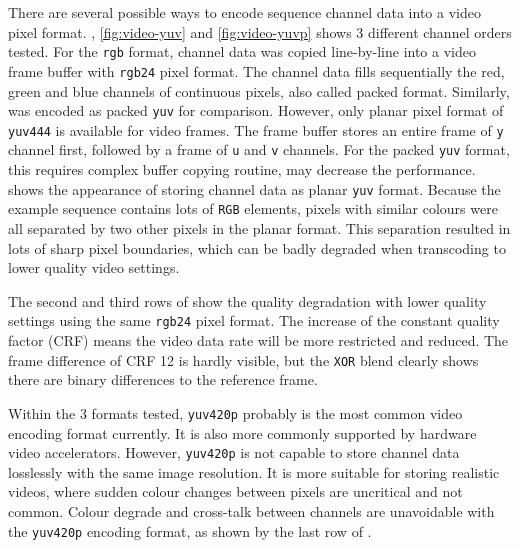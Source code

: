 There are several possible ways to encode sequence channel data into a video pixel format. , \ref{fig:video-yuv} and \ref{fig:video-yuvp} shows 3 different channel orders tested. For the \texttt{rgb} format, channel data was copied line-by-line into a video frame buffer with \texttt{rgb24} pixel format. The channel data fills sequentially the red, green and blue channels of continuous pixels, also called packed format. Similarly,  was encoded as packed \texttt{yuv} for comparison. However, only planar pixel format of \texttt{yuv444} is available for video frames. The frame buffer stores an entire frame of \texttt{y} channel first, followed by a frame of \texttt{u} and \texttt{v} channels. For the packed \texttt{yuv} format, this requires complex buffer copying routine, may decrease the performance.  shows the appearance of storing channel data as planar \texttt{yuv} format. Because the example sequence contains lots of \texttt{RGB} elements, pixels with similar colours were all separated by two other pixels in the planar format. This separation resulted in lots of sharp pixel boundaries, which can be badly degraded when transcoding to lower quality video settings.

The second and third rows of  show the quality degradation with lower quality settings using the same \texttt{rgb24} pixel format. The increase of the constant quality factor (CRF) means the video data rate will be more restricted and reduced. The frame difference of CRF 12 is hardly visible, but the \texttt{XOR} blend clearly shows there are binary differences to the reference frame.

Within the 3 formats tested, \texttt{yuv420p} probably is the most common video encoding format currently. It is also more commonly supported by hardware video accelerators. However, \texttt{yuv420p} is not capable to store channel data losslessly with the same image resolution. It is more suitable for storing realistic videos, where sudden colour changes between pixels are uncritical and not common. Colour degrade and cross-talk between channels are unavoidable with the \texttt{yuv420p} encoding format, as shown by the last row of .

